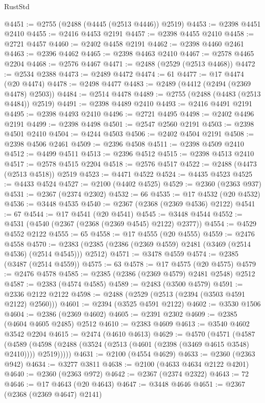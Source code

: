\begin{lexlean}{RustStd}
\begin{coremodule}
{\begin{coremodule}
{{{{{{{{{{{{{{{{{{{{{{{{{{{{{{{{{{{{{{{{{{{{{{{{{{@4451 := @2755 (@2488 (@4445 (@2513 @4446)) @2519)
@4453 := @2398 @4451 @2410
@4455 := @2416 @4453 @2191
@4457 := @2398 @4455 @2410
@4458 := @2721 @4457
@4460 := @2402 @4458 @2191
@4462 := @2398 @4460 @2461
@4463 := @2396 @4462
@4465 := @2398 @4463 @2410
@4467 := @2578 @4465 @2204
@4468 := @2576 @4467
@4471 := @2488 (@2529 (@2513 @4468))
@4472 := @2534 @2388
@4473 := @2489 @4472
@4474 := 61
@4477 := @17 @4474 (@20 @4474)
@4478 := @2498 @4477
@4483 := @2489 (@4412 (@2494 (@2369 @4478) @2503))
@4484 := @2514 @4478
@4489 := @2755 (@2488 (@4483 (@2513 @4484)) @2519)
@4491 := @2398 @4489 @2410
@4493 := @2416 @4491 @2191
@4495 := @2398 @4493 @2410
@4496 := @2721 @4495
@4498 := @2402 @4496 @2191
@4499 := @2398 @4498
@4501 := @2547 @2560 @2191
@4503 := @2398 @4501 @2410
@4504 := @4244 @4503
@4506 := @2402 @4504 @2191
@4508 := @2398 @4506 @2461
@4509 := @2396 @4508
@4511 := @2398 @4509 @2410
@4512 := @4499 @4511
@4513 := @2396 @4512
@4515 := @2398 @4513 @2410
@4517 := @2578 @4515 @2204
@4518 := @2576 @4517
@4522 := @2488 (@4473 (@2513 @4518)) @2519
@4523 := @4471 @4522
@4524 := @4435 @4523
@4525 := @4433 @4524
@4527 := @2100 (@4402 @4525)
@4529 := @2360 (@2363 @937)
@4531 := @2367 (@2374 @2302)
@4532 := 66
@4535 := @17 @4532 (@20 @4532)
@4536 := @3448 @4535
@4540 := @2367 (@2368 (@2369 @4536) @2122)
@4541 := 67
@4544 := @17 @4541 (@20 @4541)
@4545 := @3448 @4544
@4552 := @4531 (@4540 (@2367 (@2368 (@2369 @4545) @2122) @2377))
@4554 := @4529 @4552 @2122
@4555 := 65
@4558 := @17 @4555 (@20 @4555)
@4559 := @2476 @4558
@4570 := @2383 (@2385 (@2386 (@2369 @4559) @2481 (@3469 (@2514 @4536) (@2514 @4545))) @2512)
@4571 := @3478 @4559
@4574 := @2385 (@3487 (@2514 @4559))
@4575 := 63
@4578 := @17 @4575 (@20 @4575)
@4579 := @2476 @4578
@4585 := @2385 (@2386 (@2369 @4579) @2481 @2548) @2512
@4587 := @2383 (@4574 @4585)
@4589 := @2483 (@3500 @4579)
@4591 := @2336 @2122 @2122
@4598 := @2488 (@2529 (@2513 (@2394 (@3503 @4591 @2122) @2560)))
@4601 := @2394 (@3525 @4591 @2122)
@4602 := @3530 @1506
@4604 := @2386 (@2369 @4602)
@4605 := @2391 @2302
@4609 := @2385 (@4604 @4605 @2485) @2512
@4610 := @2383 @4609
@4613 := @3540 @4602 @3542 @2204
@4615 := @2474 (@4610 @4613)
@4629 := @4570
    (@4571
      (@4587
        (@4589 (@4598 (@2488 (@3524 (@2513 (@4601 (@2398 (@3469 @4615 @3548) @2410)))) @2519)))))
@4631 := @2100 (@4554 @4629)
@4633 := @2360 (@2363 @942)
@4634 := @3277 @3811
@4638 := @2100 (@4633 @4634 @2122 @4201)
@4640 := @2360 (@2363 @972)
@4642 := @2367 (@2374 @2322)
@4643 := 72
@4646 := @17 @4643 (@20 @4643)
@4647 := @3448 @4646
@4651 := @2367 (@2368 (@2369 @4647) @2141)
}}}}}}}}}}}}}}}}}}}}}}}}}}}}}}}}}}}}}}}}}}}}}}}}}}
\end{coremodule}}
\end{coremodule}
\end{lexlean}

